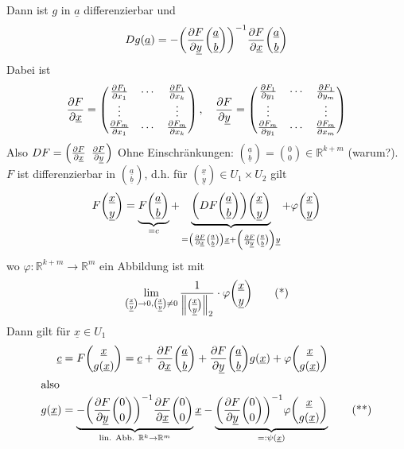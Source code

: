 Dann ist $g$ in $\underline{a}$ differenzierbar und  
\[
	D g(\underline{a}) = - \enbrace*{\diff{F}{\underline{y}} \binom{\underline{a}}{\underline{b}}} ^{-1} \diff{F}{\underline{x}} \binom{\underline{a}}{\underline{b}}
\]
Dabei ist 
\[
	\diff{F}{\underline{x}} = \begin{pmatrix}
		\diff{F_1}{x_1} & \cdots & \diff{F_1}{x_k} \\
		\vdots & & \vdots \\
		\diff{F_m}{x_1} & \cdots & \diff{F_m}{x_k}
	\end{pmatrix} , \quad \diff{F}{\underline{y}} = \begin{pmatrix}
		\diff{F_1}{y_1} & \cdots & \diff{F_1}{y_m} \\
		\vdots & & \vdots \\
		\diff{F_m}{y_1} & \cdots & \diff{F_m}{x_m}
	\end{pmatrix}
\] 
Also $D F = \enbrace*{\diff{F}{\underline{x}} \enspace \diff{F}{\underline{y}}} $
Ohne Einschränkungen: $\binom{\underline{a}}{\underline{b}} = \binom{0}{0}\in\mathds{R}^{k+m}$ (warum?). $F$ ist differenzierbar in $\binom{\underline{a}}{\underline{b}}$,
d.h. für $\binom{\underline{x}}{\underline{y}} \in U_1 \times U_2$ gilt
\begin{align*}
	F \binom{\underline{x}}{\underline{y}} = \underbrace{F \binom{\underline{a}}{\underline{b}}}_{=c} + \underbrace{\enbrace*{D F \binom{\underline{a}}{\underline{b}}} \binom{\underline{x}}{\underline{y}}}_{= \enbrace*{\diff{F}{\underline{x}} \binom{\underline{a}}{\underline{b}}} \underline{x} + \enbrace*{ \diff{F}{\underline{y}} \binom{\underline{a}}{\underline{b}} } \underline{y}  } + \varphi \binom{\underline{x}}{\underline{y}} 
\end{align*}
wo $\varphi : \mathds{R}^{k+m} \to \mathds{R}^m$ ein Abbildung ist mit 
\[
	\lim_{ \binom{\underline{x}}{\underline{y}} \to 0, \binom{\underline{x}}{\underline{y}} \not= 0} \frac{1}{\norm[2]{\binom{\underline{x}}{\underline{y}}} } \cdot \varphi \binom{\underline{x}}{\underline{y}} \tag{*}
\]
Dann gilt für $\underline{x} \in U_1$
\begin{align*}
	\underline{c} &= F \binom{\underline{x}}{g(\underline{x})} = \underline{c} + \diff{F}{\underline{x}} \binom{\underline{a}}{\underline{b}} + \diff{F}{\underline{y}}
	\binom{\underline{a}}{\underline{b}} g(\underline{x}) + \varphi \binom{\underline{x}}{g(\underline{x})} \\
	\intertext{also}
	g(\underline{x}) &= \underbrace{- \enbrace*{\diff{F}{\underline{y}} \binom{0}{0} }^{-1} \diff{F}{\underline{x}} \binom{0}{0}}_{\text{lin. Abb. }\mathds{R}^k \to \mathds{R}^m} \underline{x} - \underbrace{\enbrace*{\diff{F}{\underline{y}} 
	\binom{0}{0} } ^{-1} \varphi \binom{\underline{x}}{g(\underline{x})} }_{=: \psi (\underline{x})} \tag{**}
\end{align*}
